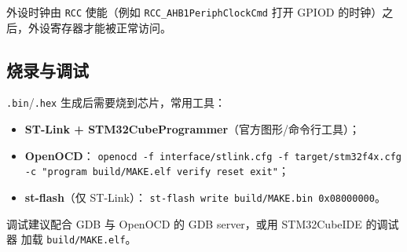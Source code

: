 外设时钟由 \texttt{RCC} 使能（例如 \texttt{RCC\_AHB1PeriphClockCmd}
打开 GPIOD 的时钟）之后，外设寄存器才能被正常访问。

\subsection{烧录与调试}

\texttt{.bin}/\texttt{.hex} 生成后需要烧到芯片，常用工具：

\begin{itemize}
  \item \textbf{ST-Link + STM32CubeProgrammer}（官方图形/命令行工具）；
  \item \textbf{OpenOCD}：
        \texttt{openocd -f interface/stlink.cfg -f target/stm32f4x.cfg
        -c "program build/MAKE.elf verify reset exit"}；
  \item \textbf{st-flash}（仅 ST-Link）：
        \texttt{st-flash write build/MAKE.bin 0x08000000}。
\end{itemize}

调试建议配合 GDB 与 OpenOCD 的 GDB server，或用 STM32CubeIDE 的调试器
加载 \texttt{build/MAKE.elf}。

